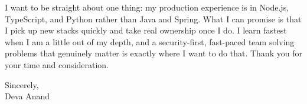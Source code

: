 \documentclass[letterpaper,11pt]{article}
\begin{document}
I want to be straight about one thing: my production experience is in Node.js, TypeScript, and Python rather than Java and Spring. What I can promise is that I pick up new stacks quickly and take real ownership once I do. I learn fastest when I am a little out of my depth, and a security-first, fast-paced team solving problems that genuinely matter is exactly where I want to do that. Thank you for your time and consideration.

\vspace{6pt}

\noindent Sincerely,\\
Deva Anand
\end{document}
